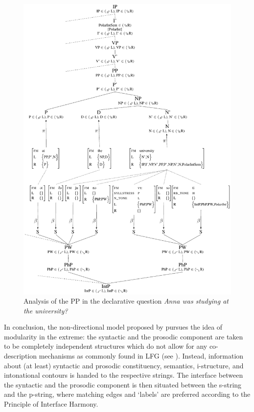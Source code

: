 \documentclass[output=paper,hidelinks]{langscibook}
\begin{document}
\begin{figure}[p]
\includegraphics[width=\textwidth]{figures/Prosody/Boegel_Figure_17.pdf}
\caption{Analysis of the PP in the declarative question {\em Anna was studying at the university?}\label{fig:compl}}
\end{figure}

In conclusion, the non-directional model proposed by \citet{DLM:LFG} pursues the idea of modularity in the extreme: the syntactic and the prosodic component are taken to be completely independent  structures which do not allow for any co-description mechanisms as commonly found in LFG (see ).
Instead, information about (at least) syntactic and prosodic constituency, semantics, i-structure, and intonational contours is handed to the respective strings. The interface between the syntactic and the prosodic component is then situated between the s-string and the p-string, where matching edges and `labels' are preferred according to the Principle of Interface Harmony. 
\end{document}
